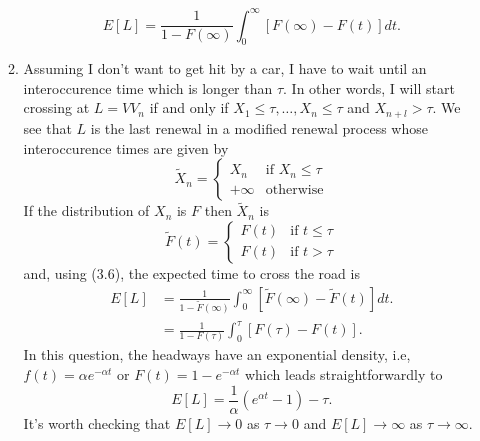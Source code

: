 \documentclass[11pt,a4paper]{article}
\begin{document}
\begin{enumerate}
\begin{enumerate}
\begin{equation}
        E[L] = \frac{1}{1 - F(\infty)}\int_0^\infty[F(\infty) - F(t)]dt.
      \end{equation}
      \item Assuming I don't want to get hit by a car, I have to wait until an interoccurence time which is longer than $\tau$. In other words, I will start crossing at $L = VV_n$ if and only if $X_1 \leq \tau,\ldots,X_n\leq \tau$ and $X_{n+l} > \tau$. We see that $L$ is the last renewal in a modified renewal process whose interoccurence times are given by
      $$
      \tilde{X}_n =
      \begin{cases}
        X_n & \text{if $X_n \leq \tau$}\\
        +\infty & \text{otherwise}
      \end{cases}
      $$
      If the distribution of $X_n$ is $F$ then $\tilde{X}_n$ is
      $$
      \tilde{F}(t) =
      \begin{cases}
        F(t) & \text{if $t \leq \tau$}\\
        F(t) & \text{if $t > \tau$}
      \end{cases}
      $$
      and, using (3.6), the expected time to cross the road is
      \begin{align*}
        E[L]
        &= \frac{1}{1 - \tilde{F}(\infty)}\int_0^\infty [\tilde{F}(\infty) - \tilde{F}(t)]dt.\\
        &= \frac{1}{1 - F(\tau)}\int_0^\tau[F(\tau) - F(t)].
      \end{align*}
      In this question, the headways have an exponential density, i.e, $f(t) = \alpha e^{-\alpha t}$ or $F(t) = 1 - e^{-\alpha t}$ which leads straightforwardly to
      $$
      E[L] = \frac{1}{\alpha}(e^{\alpha t} - 1) - \tau.
      $$
      It's worth checking that $E[L] \to 0$ as $\tau \to 0$ and $E[L] \to \infty$ as $\tau \to \infty$.
    \end{enumerate}
  \end{enumerate}
\end{document}

